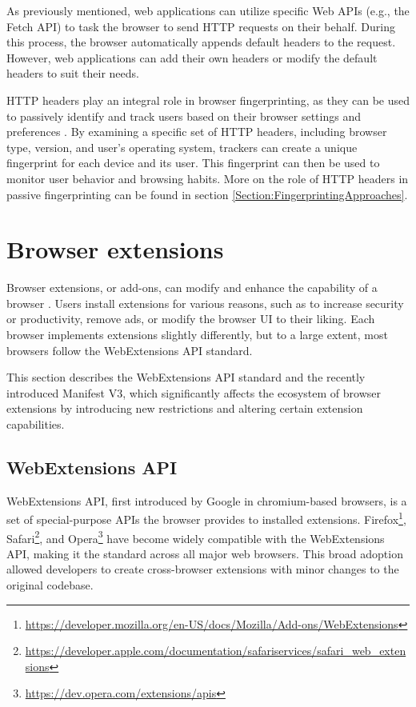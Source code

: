 As previously mentioned, web applications can utilize specific Web APIs (e.g., the Fetch API) to task the browser to send HTTP requests on their behalf. During this process, the browser automatically appends default headers to the request. However, web applications can add their own headers or modify the default headers to suit their needs.

HTTP headers play an integral role in browser fingerprinting, as they can be used to passively identify and track users based on their browser settings and preferences \cite{FingerprintingSurvey}. By examining a specific set of HTTP headers, including browser type, version, and user's operating system, trackers can create a unique fingerprint for each device and its user. This fingerprint can then be used to monitor user behavior and browsing habits. More on the role of HTTP headers in passive fingerprinting can be found in section \ref{Section:FingerprintingApproaches}.

\section{Browser extensions}
\label{Section:Extensions}

Browser extensions, or add-ons, can modify and enhance the capability of a browser \cite{MDNWebExtensions}. Users install extensions for various reasons, such as to increase security or productivity, remove ads, or modify the browser UI to their liking. Each browser implements extensions slightly differently, but to a large extent, most browsers follow the WebExtensions API standard.

This section describes the WebExtensions API standard and the recently introduced Manifest V3, which significantly affects the ecosystem of browser extensions by introducing new restrictions and altering certain extension capabilities.

\subsection{WebExtensions API}

WebExtensions API, first introduced by Google in chromium-based browsers, is a set of special-purpose APIs the browser provides to installed extensions. Firefox\footnote{\url{https://developer.mozilla.org/en-US/docs/Mozilla/Add-ons/WebExtensions}}, Safari\footnote{\url{https://developer.apple.com/documentation/safariservices/safari_web_extensions}}, and Opera\footnote{\url{https://dev.opera.com/extensions/apis}} have become widely compatible with the WebExtensions API, making it the standard across all major web browsers. This broad adoption allowed developers to create cross-browser extensions with minor changes to the original codebase.

